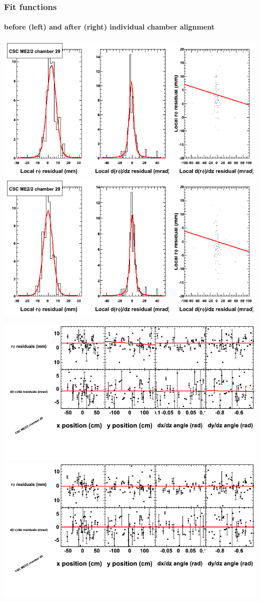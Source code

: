 \documentclass[compress]{beamer}
\begin{document}
\begin{frame}
\frametitle{Fit functions}
\framesubtitle{before (left) and after (right) individual chamber alignment}
\includegraphics[width=0.5\linewidth]{ringfits_3dof/beforefit_MEp22_29_bellcurve.png} \includegraphics[width=0.5\linewidth]{ringfits_3dof/afterfit_MEp22_29_bellcurve.png}

\includegraphics[width=0.5\linewidth]{ringfits_3dof/beforefit_MEp22_29_polynomials.png} \includegraphics[width=0.5\linewidth]{ringfits_3dof/afterfit_MEp22_29_polynomials.png}
\end{frame}
\end{document}
